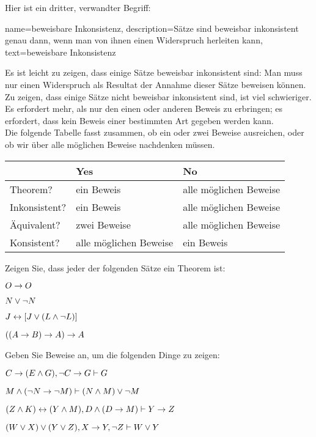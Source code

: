 Hier ist ein dritter, verwandter Begriff:
        
{    name={beweisbare Inkonsistenz}, 
  description={Sätze sind beweisbar inkonsistent genau dann, wenn man von ihnen einen Widerspruch herleiten kann},
    text={beweisbare Inkonsistenz}
}

Es ist leicht zu zeigen, dass einige Sätze beweisbar inkonsistent sind: Man muss nur einen Widerspruch als Resultat der Annahme dieser Sätze beweisen können. Zu zeigen, dass einige Sätze nicht beweisbar inkonsistent sind, ist viel schwieriger. Es erfordert mehr, als nur den einen oder anderen Beweis zu erbringen; es erfordert, dass kein Beweis einer bestimmten Art gegeben werden kann.
\
\\
Die folgende Tabelle fasst zusammen, ob ein oder zwei Beweise ausreichen, oder ob wir über alle möglichen Beweise nachdenken müssen.
\begin{center}
\begin{tabular}{l l l}
 & \textbf{Yes} & \textbf{No}\\
 \hline
Theorem? & ein Beweis & alle möglichen Beweise\\
Inkonsistent? &  ein Beweis  & alle möglichen Beweise\\
Äquivalent? & zwei Beweise & alle möglichen Beweise\\
Konsistent? & alle möglichen Beweise & ein Beweis\\
\end{tabular}
\end{center}


\practiceproblems
\problempart
Zeigen Sie, dass jeder der folgenden Sätze ein Theorem ist:
\begin{earg}
\item $O \rightarrow O$
\item $N \vee \neg N$
\item $J \leftrightarrow [J\vee (L\wedge\neg L)]$
\item $((A \rightarrow B) \rightarrow A) \rightarrow A$ 
\end{earg}

\problempart
Geben Sie Beweise an, um die folgenden Dinge zu zeigen:
\begin{earg}
\item $C\rightarrow(E\wedge G), \neg C \rightarrow G \vdash G$
\item $M \wedge (\neg N \rightarrow \neg M) \vdash (N \wedge M) \vee \neg M$
\item $(Z\wedge K)\leftrightarrow(Y\wedge M), D\wedge(D\rightarrow M) \vdash Y\rightarrow Z$
\item $(W \vee X) \vee (Y \vee Z), X\rightarrow Y, \neg Z \vdash W\vee Y$
\end{earg}

